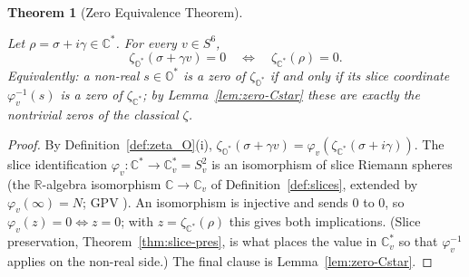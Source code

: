 \documentclass[11pt]{article}
\newcommand{\OO}{\mathbb{O}}
\newcommand{\CC}{\mathbb{C}}
\newcommand{\RR}{\mathbb{R}}
\newcommand{\Ostar}{\OO^{*}}
\newcommand{\Cstar}{\CC^{*}}
\newcommand{\zetaO}{\zeta_{\Ostar}}
\newcommand{\zetaC}{\zeta_{\Cstar}}
\providecommand{\lean}[1]{}
\providecommand{\uses}[1]{}
\theoremstyle{plain}
\newtheorem{theorem}{Theorem}[section]
\theoremstyle{definition}
\theoremstyle{remark}
\begin{document}
\begin{theorem}[Zero Equivalence Theorem]\label{thm:zero-equivalence}
\lean{sliceEmbed_eq_zero_iff, zetaO_zero_iff}
\uses{def:zeta_O, thm:slice-pres, lem:zero-Cstar}
Let $\rho=\sigma+i\gamma\in\Cstar$. For every $v\in S^6$,
\[
\zetaO(\sigma+\gamma v)=0\quad\Longleftrightarrow\quad\zetaC(\rho)=0 .
\]
Equivalently: a non-real $s\in\Ostar$ is a zero of $\zetaO$ if and only if its slice
coordinate $\varphi_v^{-1}(s)$ is a zero of $\zetaC$; by Lemma~\ref{lem:zero-Cstar} these
are exactly the nontrivial zeros of the classical $\zeta$.
\end{theorem}
\begin{proof}
By Definition~\ref{def:zeta_O}(i), $\zetaO(\sigma+\gamma v)=\varphi_v(\zetaC(\sigma+i\gamma))$.
The slice identification $\varphi_v:\Cstar\to\CC_v^{*}=S^2_v$ is an isomorphism of slice
Riemann spheres (the $\RR$-algebra isomorphism $\CC\to\CC_v$ of
Definition~\ref{def:slices}, extended by $\varphi_v(\infty)=N$; GPV \cite{VS}). An
isomorphism is injective and sends $0$ to $0$, so $\varphi_v(z)=0\iff z=0$; with
$z=\zetaC(\rho)$ this gives both implications. (Slice preservation,
Theorem~\ref{thm:slice-pres}, is what places the value in $\CC_v^{*}$ so that
$\varphi_v^{-1}$ applies on the non-real side.) The final clause is
Lemma~\ref{lem:zero-Cstar}.
\end{proof}
\end{document}
